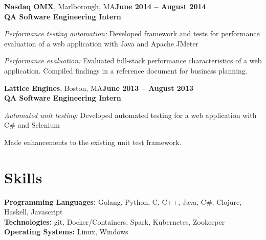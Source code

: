 \documentclass[margin,line]{resume}
\begin{document}
\begin{resume}
\textbf{Nasdaq OMX}, Marlborough, MA\hfill\textbf{June 2014 -- August 2014}\\
\textbf{QA Software Engineering Intern}\hfill 
\vspace{-3mm}\\\vspace{-1mm}
\begin{list2}
	\item \filbreak\textit{Performance testing automation:} Developed framework
    and tests for performance evaluation of a web application with Java and Apache JMeter
	\item \filbreak\textit{Performance evaluation:} Evaluated full-stack performance characteristics of a web application. Compiled findings in a reference document for business planning.
\end{list2}

\textbf{Lattice Engines}, Boston, MA\hfill\textbf{June 2013 -- August 2013}\\
\textbf{QA Software Engineering Intern}\hfill 
\vspace{-3mm}\\\vspace{-1mm}
\begin{list2}
	\item \filbreak\textit{Automated unit testing:} Developed automated testing
    for a web application with C\# and Selenium
    \item Made enhancements to the existing unit test framework.
\end{list2}



\filbreak
\section{\mysidestyle Skills}
\textbf{Programming Languages:} Golang, Python, C, C++, Java, C\#, Clojure,
Haskell, Javascript\\
\textbf{Technologies:} git, Docker/Containers, Spark, Kubernetes, Zookeeper\\
\textbf{Operating Systems:} Linux, Windows



\end{resume}
\end{document}
